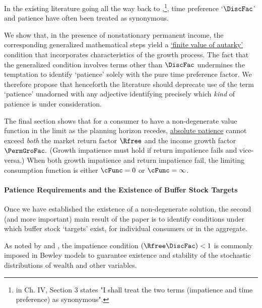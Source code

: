 \documentclass[BufferStockTheory]{subfiles}
\begin{document}
In the existing literature going all the way back to \cite{fisherInterestTheory},\footnote{\cite{fisherInterestTheory} in Ch. IV, Section 3 states "I shall treat the two terms (impatience and time preference) as synonymous".}, time preference `$\DiscFac$' and patience have often been treated as synonymous. %

We show that, in the presence of nonstationary permanent income, the corresponding generalized mathematical steps yield a \hyperlink{FVAC}{`finite value of autarky'} condition that incorporates characteristics of the growth process. The fact that the generalized condition involves terms other than $\DiscFac$ undermines the temptation to identify `patience' solely with the pure time preference factor.  We therefore propose that henceforth the literature should deprecate use of the term `patience' unadorned with any adjective identifying precisely which \textit{kind} of patience is under consideration. 

The final section shows that for a consumer to have a non-degenerate value function in the limit as the planning horizon recedes, \hyperlink{APF}{absolute patience} cannot exceed \textit{both} the market return factor $\Rfree$ and the income growth factor $\PermGroFac.$
(Growth impatience must hold if return impatience fails and vice-versa.)
When both growth impatience and return impatience fail, the limiting consumption function is either $\cFunc=0$ or $\cFunc=\infty$. 

\paragraph{Patience Requirements and the Existence of Buffer Stock Targets}%

Once we have established the existence of a non-degenerate solution, the second (and more important) main result of the paper is to identify conditions under which buffer stock `targets' exist, for individual consumers or in the aggregate.

As noted by \cite{szeidlInvariant} and \cite{maUnboundedDP}, the impatience condition $(\Rfree \DiscFac) < 1$ is commonly imposed in Bewley models to guarantee existence and stability of the stochastic distributions of wealth and other variables.  %
\end{document}

